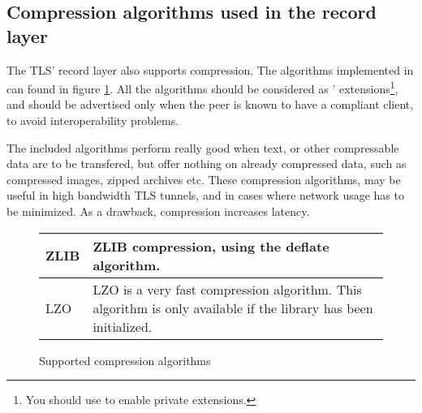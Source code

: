 \subsection{Compression algorithms used in the record layer}
The TLS' record layer also supports compression. The algorithms
implemented in \gnutls{} can found in figure \ref{fig:compression}.
All the algorithms should be considered as \gnutls' extensions\footnote{
You should use 
to enable private extensions.}, and
should be advertised only when the peer is known to have a compliant client,
to avoid interoperability problems.
\par
The included algorithms perform really good when text, or other
compressable data are to be transfered, but offer nothing on already 
compressed data, such as compressed images, zipped archives etc.
These compression algorithms, may be useful in high bandwidth TLS tunnels,
and in cases where network usage has to be minimized. As a drawback, 
compression increases latency.

\begin{figure}[hbtp]
\begin{tabular}{|l|p{9cm}|}

\hline
ZLIB & ZLIB compression, using the deflate algorithm.
\\
\hline
LZO & LZO is a very fast compression algorithm. This algorithm is only
available if the \gnutlse{} library has been initialized.
\\
\hline
\end{tabular}
\caption{Supported compression algorithms}
\label{fig:compression}
\end{figure}


